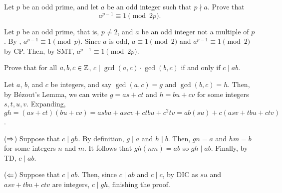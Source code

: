 \documentclass{agony}
\begin{document}
\begin{prob}
  Let $p$ be an odd prime, and let $a$ be an odd integer such that $p \nmid a$.
  Prove that \[ a^{p-1} \equiv 1 \pmod{2p}. \]
\end{prob}
\begin{prf}
  Let $p$ be an odd prime, that is, $p \neq 2$, and $a$ be an odd integer not a multiple of $p$.
  By \FLT, $a^{p-1} \equiv 1 \pmod p$.
  Since $a$ is odd, $a \equiv 1 \pmod 2$ and $a^{p-1} \equiv 1 \pmod 2$ by CP\@.
  Then, by SMT, $a^{p-1} \equiv 1 \pmod{2p}$.
\end{prf}

\begin{prob}
  Prove that for all $a,b,c \in \mathbb{Z}$, $c \mid \gcd(a,c) \cdot \gcd(b,c)$ if and only if $c \mid ab$.
\end{prob}
\begin{prf}
  Let $a$, $b$, and $c$ be integers, and say $\gcd(a,c) = g$ and $\gcd(b,c) = h$.
  Then, by Bézout's Lemma, we can write $g = as + ct$ and $h = bu + cv$ for some integers $s,t,u,v$.
  Expanding, $gh = (as + ct)(bu + cv) = asbu + ascv + ctbu + c^2tv = ab(su) + c(asv+tbu+ctv)$.

  ($\Rightarrow$) Suppose that $c \mid gh$.
  By definition, $g \mid a$ and $h \mid b$.
  Then, $gn = a$ and $hm = b$ for some integers $n$ and $m$.
  It follows that $gh(nm) = ab$ so $gh \mid ab$.
  Finally, by TD, $c \mid ab$.

  ($\Leftarrow$) Suppose that $c \mid ab$.
  Then, since $c \mid ab$ and $c \mid c$, by DIC as $su$ and $asv+tbu+ctv$ are integers, $c \mid gh$,
  finishing the proof.
\end{prf}
\end{document}
